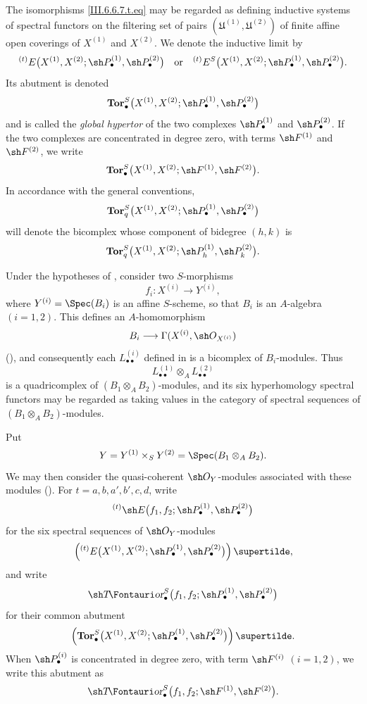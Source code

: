 \begin{env}[6.6.7]

The isomorphisms \eqref{III.6.6.7.t.eq} may be regarded as
defining inductive systems of spectral functors on the filtering
set of pairs
$(\mathfrak U^{(1)},\mathfrak U^{(2)})$ of finite affine open
coverings of $X^{(1)}$ and $X^{(2)}$.  We denote the inductive
limit by
\[
  {}^{(t)}E
  \bigl(
    X^{(1)},X^{(2)};
    \sh P_\bullet^{(1)},\sh P_\bullet^{(2)}
  \bigr)
  \quad\text{or}\quad
  {}^{(t)}E^S
  \bigl(
    X^{(1)},X^{(2)};
    \sh P_\bullet^{(1)},\sh P_\bullet^{(2)}
  \bigr).
\]
Its abutment is denoted
\[
  \mathbf{Tor}_\bullet^S
  \bigl(
    X^{(1)},X^{(2)};
    \sh P_\bullet^{(1)},\sh P_\bullet^{(2)}
  \bigr)
\]
and is called the \emph{global hypertor} of the two complexes
$\sh P_\bullet^{(1)}$ and $\sh P_\bullet^{(2)}$.  If the two
complexes are concentrated in degree zero, with terms
$\sh F^{(1)}$ and $\sh F^{(2)}$, we write
\[
  \mathbf{Tor}_\bullet^S
  \bigl(
    X^{(1)},X^{(2)};
    \sh F^{(1)},\sh F^{(2)}
  \bigr).
\]
In accordance with the general conventions,
\[
  \mathbf{Tor}_q^S
  \bigl(
    X^{(1)},X^{(2)};
    \sh P_\bullet^{(1)},\sh P_\bullet^{(2)}
  \bigr)
\]
will denote the bicomplex whose component of bidegree $(h,k)$ is
\[
  \mathbf{Tor}_q^S
  \bigl(
    X^{(1)},X^{(2)};
    \sh P_h^{(1)},\sh P_k^{(2)}
  \bigr).
\]
\end{env}

\begin{env}[6.6.8]
\label{III.6.6.8}
Under the hypotheses of , consider two
$S$-morphisms
\[
  f_i:X^{(i)}\longrightarrow Y^{(i)},
\]
where
$Y^{(i)}=\Spec(B_i)$ is an affine $S$-scheme, so that $B_i$ is
an $A$-algebra $(i=1,2)$.  This defines an $A$-homomorphism
\[
  B_i\longrightarrow
  \Gamma(X^{(i)},\sh O_{X^{(i)}})
\]
(), and consequently each
$L_{\bullet\bullet}^{(i)}$ defined in  is a
bicomplex of $B_i$-modules.  Thus
\[
  L_{\bullet\bullet}^{(1)}
  \otimes_A L_{\bullet\bullet}^{(2)}
\]
is a quadricomplex of $(B_1\otimes_AB_2)$-modules, and its six
hyperhomology spectral functors may be regarded as taking values
in the category of spectral sequences of
$(B_1\otimes_AB_2)$-modules.

Put
\[
  Y=Y^{(1)}\times_SY^{(2)}
   =\Spec(B_1\otimes_AB_2).
\]
We may then consider the quasi-coherent $\sh O_Y$-modules
associated with these modules ().  For
$t=a,b,a',b',c,d$, write
\[
  {}^{(t)}\sh E
  \bigl(
    f_1,f_2;
    \sh P_\bullet^{(1)},\sh P_\bullet^{(2)}
  \bigr)
\]
for the six spectral sequences of $\sh O_Y$-modules
\[
  \left(
    {}^{(t)}E
    \bigl(
      X^{(1)},X^{(2)};
      \sh P_\bullet^{(1)},\sh P_\bullet^{(2)}
    \bigr)
  \right)\supertilde,
\]
and write
\[
  \shTor_\bullet^S
  \bigl(
    f_1,f_2;
    \sh P_\bullet^{(1)},\sh P_\bullet^{(2)}
  \bigr)
\]
for their common abutment
\[
  \left(
    \mathbf{Tor}_\bullet^S
    \bigl(
      X^{(1)},X^{(2)};
      \sh P_\bullet^{(1)},\sh P_\bullet^{(2)}
    \bigr)
  \right)\supertilde.
\]
When $\sh P_\bullet^{(i)}$ is concentrated in degree zero, with
term $\sh F^{(i)}$ $(i=1,2)$, we write this abutment as
\[
  \shTor_\bullet^S
  \bigl(
    f_1,f_2;
    \sh F^{(1)},\sh F^{(2)}
  \bigr).
\]
\end{env}


